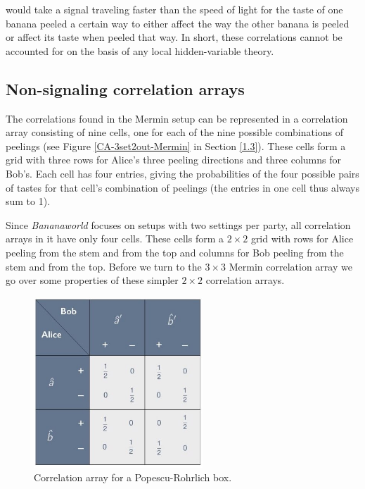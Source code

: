 would take a signal traveling faster than the speed of light for the taste of one banana peeled a certain way to either affect the way the other banana is peeled or affect its taste when peeled that way. In short, these correlations cannot be accounted for on the basis of any local hidden-variable theory. 

\subsection{Non-signaling correlation arrays} \label{1.2}

The correlations found in the Mermin setup can be represented in a correlation array consisting of nine cells, one for each of the nine possible combinations of peelings (see Figure \ref{CA-3set2out-Mermin} in Section \ref{1.3}). These cells form a grid with three rows for Alice's three peeling directions and three columns for Bob's. Each cell has four entries, giving the probabilities of the four possible pairs of tastes for that cell's combination of peelings (the entries in one cell thus always sum to 1). 

Since \emph{Bananaworld} focuses on setups with two settings per party, all correlation arrays in it have only four cells. These cells form a $2 \times 2$ grid with rows for Alice peeling from the stem and from the top and columns for Bob peeling from the stem and from the top. Before we turn to the $3 \times 3$ Mermin correlation array we go over some properties of these simpler $2 \times 2$ correlation arrays. 

\begin{figure}[h]
 \centering
   \includegraphics[width=2.5in]{CA-PRbox.jpeg} 
   \caption{Correlation array for a Popescu-Rohrlich box.}
   \label{CA-PRbox}
\end{figure}  

